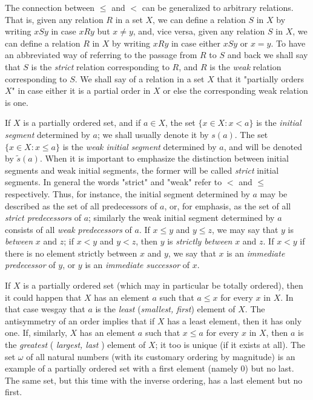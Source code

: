 The connection between $\le$ and $<$ can be generalized to arbitrary relations. That is, given any relation $R$ in a set $X$, we can define a relation $S$ in $X$ by writing $xSy$ in case $xRy$ but $x \neq y$, and, vice versa, given any relation $S$ in $X$, we can define a relation $R$ in $X$ by writing $xRy$ in case either $xSy$ or $x = y$. To have an abbreviated way of referring to the passage from $R$ to $S$ and back we shall say that $S$ is the \textit{strict} relation corresponding to $R$, and $R$ is the \textit{weak} relation corresponding to $S$. We shall say of a relation in a set $X$ that it "partially orders $X$" in case either it is a partial order in $X$ or else the corresponding weak relation is one.

If $X$ is a partially ordered set, and if $a \in X$, the set $\{ x \in X:x < a \}$ is the \textit{initial segment} determined by $a$; we shall usually denote it by $s(a)$. The set $\{ x \in X: x \le a \}$ is the \textit{weak initial segment} determined by $a$, and will be denoted by $\tilde{s}(a)$. When it is important to emphasize the distinction between initial segments and weak initial segments, the former will be called \textit{strict} initial segments. In general the words "strict" and "weak" refer to $<$ and $\le$ respectively. Thus, for instance, the initial segment determined by $a$ may be described as the set of all predecessors of $a$, or, for emphasis, as the set of all \textit{strict predecessors} of $a$; similarly the weak initial segment determined by $a$ consists of all \textit{weak predecessors} of $a$. If $x \le y$ and $y \le z$, we may say that $y$ is \textit{between} $x$ and $z$; if $x < y$ and $y < z$, then $y$ is \textit{strictly between} $x$ and $z$. If $x < y$ if there is no element strictly between $x$ and $y$, we say that $x$ is an \textit{immediate predecessor} of $y$, or $y$ is an \textit{immediate successor} of $x$. 

If $X$ is a partially ordered set (which may in particular be totally ordered), then it could happen that $X$ has an element $a$ such that $a \le x$ for every $x$ in $X$. In that case wesgay that $a$ is the \textit{least} (\textit{smallest, first}) element of $X$. The antisymmetry of an order implies that if $X$ has a least element, then it has only one. If, similarly, $X$ has an element $a$ such that $x \le a$ for every $x$ in $X$, then $a$ is the \textit{greatest} ( \textit{largest, last} ) element of $X$; it too is unique (if it exists at all). The set $\omega$ of all natural numbers (with its customary ordering by magnitude) is an example of a partially ordered set with a first element (namely $0$) but no last. The same set, but this time with the inverse ordering, has a last element but no first. 

